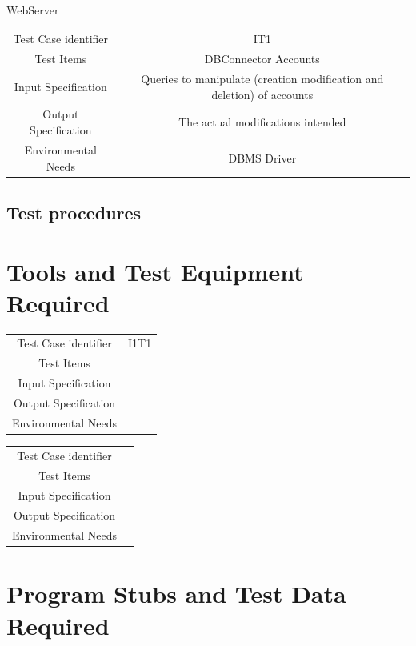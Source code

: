 \documentclass{article}
\begin{document}
	WebServer 
	\begin{tabular}{*{2}{c}}
		\toprule
		Test Case identifier & IT1\\
		Test Items & DBConnector \rightarrow Accounts \\
		Input Specification & Queries to manipulate (creation modification and deletion) of accounts\\
		Output Specification & The actual modifications intended\\
		Environmental Needs & DBMS Driver\\
		\bottomrule
	\end{tabular}
	
	
	
	
	
	
	
	
	
	
	
	\subsection{Test procedures}
	\section{Tools and Test Equipment Required}
	\begin{tabular}{*{2}{c}}
		\toprule
		Test Case identifier & I1T1\\
		Test Items & \rightarrow\\
		Input Specification & \\
		Output Specification & \\
		Environmental Needs & \\
		\bottomrule
	\end{tabular}
	\begin{tabular}{*{2}{c}}
		\toprule
		Test Case identifier & \\
		Test Items & \\
		Input Specification & \\
		Output Specification & \\
		Environmental Needs & \\
		\bottomrule
	\end{tabular}
	\section{Program Stubs and Test Data Required}
\end{document}

